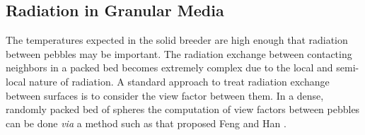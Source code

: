 






\subsection{Radiation in Granular Media}

The temperatures expected in the solid breeder are high enough that radiation between pebbles may be important. The radiation exchange between contacting neighbors in a packed bed becomes extremely complex due to the local and semi-local nature of radiation. A standard approach to treat radiation exchange between surfaces is to consider the view factor between them. In a dense, randomly packed bed of spheres the computation of view factors between pebbles can be done \textit{via} a method such as that proposed Feng and Han \cite{Feng2012}. 

